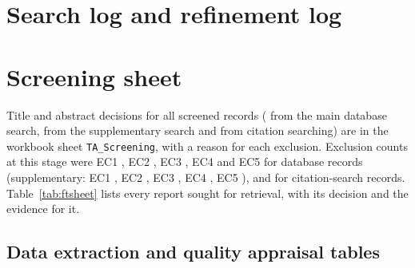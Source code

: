 {\small


}

\clearpage
\appendix
{}
\renewcommand{\thetable}{\Alph{section}.\arabic{table}}
\section{Search log and refinement log}
{\footnotesize\setlength{\tabcolsep}{2pt}}
{\footnotesize\setlength{\tabcolsep}{2pt}}
\begin{table}[H]
\centering\footnotesize
\caption{Search validation against known benchmark papers (\checkmarkx{} = retrieved).}\label{tab:validation}

\end{table}
\begin{table}[H]
\centering\footnotesize
\caption{Supplementary search validation against RQ3 benchmark papers (\checkmarkx{} = retrieved).}\label{tab:suppval}

\end{table}

\clearpage
\section{Screening sheet}
Title and abstract decisions for all \totalScreened{} screened records (\taScreened{} from the main database search, \spScreened{} from the supplementary search and \csScreened{} from citation searching) are in the workbook sheet \texttt{TA\_Screening}, with a reason for each exclusion. Exclusion counts at this stage were EC1 \dbAllExOne, EC2 \dbAllExTwo, EC3 \dbAllExThree, EC4 \dbAllExFour{} and EC5 \dbAllExFive{} for database records (supplementary: EC1 \spExOne, EC2 \spExTwo, EC3 \spExThree, EC4 \spExFour, EC5 \spExFive), and \csTaExcluded{} for citation-search records. Table~\ref{tab:ftsheet} lists every report sought for retrieval, with its decision and the evidence for it.
{\scriptsize\setlength{\tabcolsep}{2pt}}

\clearpage
\begin{landscape}
\section{Data extraction and quality appraisal tables}
{\scriptsize\setlength{\tabcolsep}{3pt}}
\clearpage
{\scriptsize\setlength{\tabcolsep}{2.5pt}}
\end{landscape}

